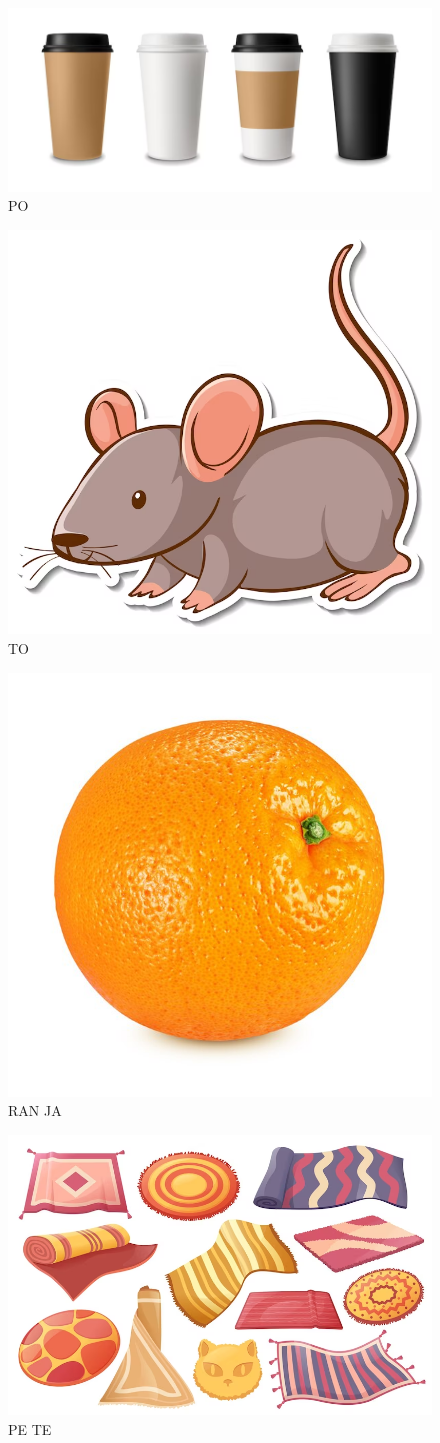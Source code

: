 \begin{figure}[htpb!]
\centering
\includegraphics[width=.3\textwidth]{media/image22.png}
\caption{ PO}
\end{figure}

\begin{figure}[htpb!]
\centering
\includegraphics[width=.3\textwidth]{media/image23.png}
\caption{ TO}
\end{figure}

\begin{figure}[htpb!]
\centering
\includegraphics[width=.3\textwidth]{media/image24.png}
\caption{ RAN JA}
\end{figure}

\begin{figure}[htpb!]
\centering
\includegraphics[width=.3\textwidth]{media/image25.png}
\caption{ PE TE}
\end{figure}




